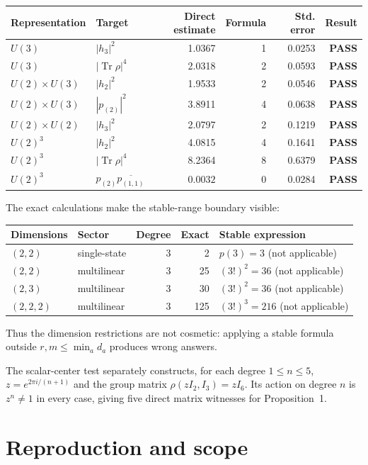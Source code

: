 \documentclass[11pt]{article}
\newcommand{\Tr}{\operatorname{Tr}}
\newcommand{\PASS}{\textcolor{passgreen}{\textbf{PASS}}}
\begin{document}
\begin{center}
\begin{tabularx}{\linewidth}{@{}Xlrrrr@{}}
\toprule
Representation & Target & Direct estimate & Formula & Std. error & Result\\
\midrule
$U(3)$ & $|h_3|^2$ & 1.0367 & 1 & 0.0253 & \PASS\\
$U(3)$ & $|\Tr\rho|^4$ & 2.0318 & 2 & 0.0593 & \PASS\\
$U(2)\times U(3)$ & $|h_2|^2$ & 1.9533 & 2 & 0.0546 & \PASS\\
$U(2)\times U(3)$ & $|p_{(2)}|^2$ & 3.8911 & 4 & 0.0638 & \PASS\\
$U(2)\times U(2)$ & $|h_3|^2$ & 2.0797 & 2 & 0.1219 & \PASS\\
$U(2)^3$ & $|h_2|^2$ & 4.0815 & 4 & 0.1641 & \PASS\\
$U(2)^3$ & $|\Tr\rho|^4$ & 8.2364 & 8 & 0.6379 & \PASS\\
$U(2)^3$ & $p_{(2)}\overline{p_{(1,1)}}$ & $0.0032$ & 0 & 0.0284 & \PASS\\
\bottomrule
\end{tabularx}
\end{center}

The exact calculations make the stable-range boundary visible:
\begin{center}
\begin{tabular}{@{}llrrl@{}}
\toprule
Dimensions & Sector & Degree & Exact & Stable expression\\
\midrule
$(2,2)$ & single-state & 3 & 2 & $p(3)=3$ (not applicable)\\
$(2,2)$ & multilinear & 3 & 25 & $(3!)^2=36$ (not applicable)\\
$(2,3)$ & multilinear & 3 & 30 & $(3!)^2=36$ (not applicable)\\
$(2,2,2)$ & multilinear & 3 & 125 & $(3!)^3=216$ (not applicable)\\
\bottomrule
\end{tabular}
\end{center}
Thus the dimension restrictions are not cosmetic: applying a stable formula
outside $r,m\le\min_a d_a$ produces wrong answers.

The scalar-center test separately constructs, for each degree $1\le n\le5$,
$z=e^{2\pi i/(n+1)}$ and the group matrix
$\rho(zI_2,I_3)=zI_6$. Its action on degree $n$ is $z^n\ne1$ in every case,
giving five direct matrix witnesses for Proposition~1.

\section{Reproduction and scope}
\end{document}
